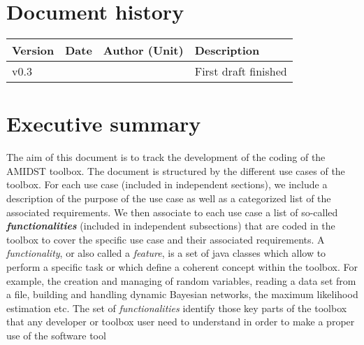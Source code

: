 \documentclass[11pt, oneside]{article}   	%
\begin{document}
%

%
%



\tableofcontents

\newpage


\section*{Document history}

\begin{table}[htbp]
  \centering
  \begin{tabularx}{\linewidth}{|p{17mm}|p{17mm}|X|X|}\hline
    {\bf Version} & {\bf Date} & {\bf Author (Unit)} & {\bf Description} \\ \hline \hline
    v0.3 &  &  & First draft finished  \\ 
\hline
  \end{tabularx}
\end{table}

\newpage



\section{Executive summary}

The aim of this document is to track the development of the coding of the AMIDST toolbox. The document is structured by the different use cases of the toolbox.  For each use case (included in independent sections),  we include a description of the purpose of the use case as well as a categorized list of the associated requirements. We then associate to each use case a list of so-called \textit{\textbf{functionalities}} (included in independent subsections) that are coded in the toolbox to cover the specific use case and their associated requirements. A \textit{functionality}, or also called a \textit{feature}, is a set of java classes which allow to perform a specific task or which define a coherent concept within the toolbox. For example, the creation and managing of random variables, reading a data set from a file, building and handling dynamic Bayesian networks, the maximum likelihood estimation etc. The set of \textit{functionalities} identify those key parts of the toolbox that any developer or toolbox user need to understand in order to make a proper use of the software tool
\end{document}
